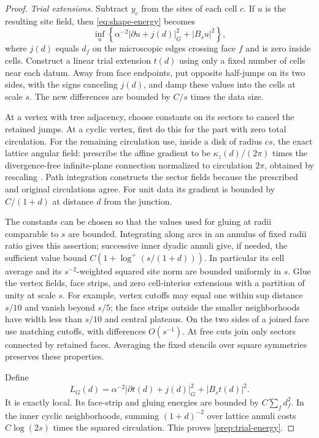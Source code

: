 \begin{proof}
\emph{Trial extensions.}
Subtract $y_c$ from the sites of each cell $c$.  If $u$ is the resulting
site field, then \eqref{eq:shape-energy} becomes
\[
 \inf_u\left\{\alpha^{-2}|\partial u+j(d)|_G^2+|B_su|^2\right\},
\]
where $j(d)$ equals $d_f$ on the microscopic edges crossing face $f$ and
is zero inside cells.  Construct a linear trial extension $t(d)$ using
only a fixed number of cells near each datum.  Away from face endpoints,
put opposite half-jumps on its two sides, with the signs canceling
$j(d)$, and damp these values into the cells at scale $s$.  The new
differences are bounded by $C/s$ times the data size.

At a vertex with tree adjacency, choose constants on its sectors to
cancel the retained jumps.  At a cyclic vertex, first do this for the
part with zero total circulation.  For the remaining circulation use,
inside a disk of radius $cs$, the exact lattice angular field: prescribe
the affine gradient to be $\kappa_z(d)/(2\pi)$ times the divergence-free
infinite-plane connection normalized to circulation $2\pi$, obtained by
rescaling \cite[Lemma 5.2]{B}.
Path integration constructs the sector fields because the prescribed
and original circulations agree.  For unit data its gradient is bounded
by $C/(1+d)$ at distance $d$ from the junction.

The constants can be chosen so that the values used for gluing at radii
comparable to $s$ are bounded.  Integrating along arcs in an annulus of
fixed radii ratio gives this assertion; successive inner dyadic annuli
give, if needed, the sufficient value bound
$C(1+\log^+(s/(1+d)))$.  In particular its cell average and its
$s^{-2}$-weighted squared site norm are bounded uniformly in $s$.
Glue the vertex fields, face strips, and zero cell-interior extensions
with a partition of unity at scale $s$.  For example, vertex cutoffs may
equal one within sup distance $s/10$ and vanish beyond $s/5$; the face
strips outside the smaller neighborhoods have width less than $s/10$
and central plateaus.  On the two sides of a joined face use matching
cutoffs, with differences $O(s^{-1})$.  At free cuts join only sectors
connected by retained faces.  Averaging the fixed stencils over square
symmetries preserves these properties.

Define
\[
 L_G(d)=\alpha^{-2}|\partial t(d)+j(d)|_G^2+|B_st(d)|^2.
\]
It is exactly local.  Its face-strip and gluing energies are bounded by
$C\sum_fd_f^2$.  In the inner cyclic neighborhoods, summing
$(1+d)^{-2}$ over lattice annuli costs $C\log(2s)$ times the squared
circulation.  This proves \eqref{prep:trial-energy}.


\end{proof}
